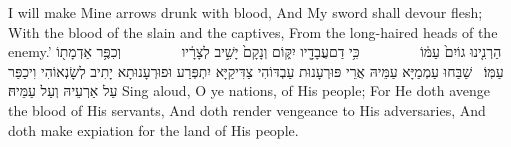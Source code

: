 {I will make Mine arrows drunk with blood, And My sword shall devour flesh; With the blood of the slain and the captives, From the long-haired heads of the enemy.’}{}
{הַרְנִ֤ינוּ גוֹיִם֙ עַמּ֔וֹ         כִּ֥י דַם\maqqaf עֲבָדָ֖יו יִקּ֑וֹם וְנָקָם֙ יָשִׁ֣יב לְצָרָ֔יו         וְכִפֶּ֥ר אַדְמָת֖וֹ עַמּֽוֹ׃ \petucha }
{שַׁבַּחוּ עַמְמַיָּא עַמֵּיהּ אֲרֵי פּוּרְעָנוּת עַבְדּוֹהִי צַדִּיקַיָּא יִתְפְּרַע וּפוּרְעָנוּתָא יָתִיב לְשָׂנְאוֹהִי וִיכַפַּר עַל אַרְעֵיהּ וְעַל עַמֵּיהּ׃}
{Sing aloud, O ye nations, of His people; For He doth avenge the blood of His servants, And doth render vengeance to His adversaries, And doth make expiation for the land of His people.}{}

